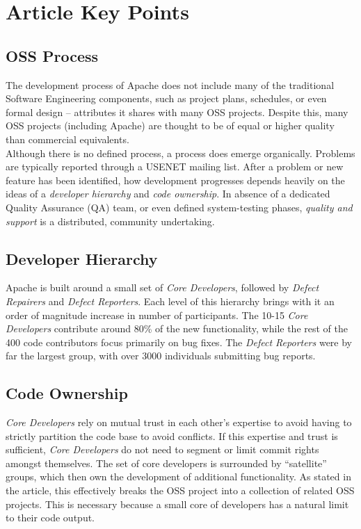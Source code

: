 \documentclass{article}
\begin{document}
\section{Article Key Points}

\subsection{OSS Process} The development process of Apache does not include many of the traditional Software Engineering components, such as project plans, schedules, or even formal design -- attributes it shares with many OSS projects\cite{dibona1999open}. Despite this, many OSS projects (including Apache) are thought to be of equal or higher quality than commercial equivalents.\\
Although there is no defined process, a process does emerge organically. Problems are typically reported through a USENET mailing list. After a problem or new feature has been identified, how development progresses depends heavily on the ideas of a {\it developer hierarchy} and {\it code ownership}. In absence of a dedicated Quality Assurance (QA) team, or even defined system-testing phases, {\it quality and support} is a distributed, community undertaking.

\subsection{Developer Hierarchy} Apache is built around a small set of {\it Core Developers}, followed by {\it Defect Repairers} and {\it Defect Reporters}. Each level of this hierarchy brings with it an order of magnitude increase in number of participants. The 10-15 {\it Core Developers} contribute around 80\% of the new functionality, while the rest of the 400 code contributors focus primarily on bug fixes. The {\it Defect Reporters} were by far the largest group, with over 3000 individuals submitting bug reports.
   
\subsection{Code Ownership} {\it Core Developers} rely on mutual trust in each other's expertise to avoid having to strictly partition the code base to avoid conflicts. If this expertise and trust is sufficient, {\it Core Developers} do not need to segment or limit commit rights amongst themselves. The set of core developers is surrounded by ``satellite'' groups, which then own the development of additional functionality. As stated in the article, this effectively breaks the OSS project into a collection of related OSS projects. This is necessary because a small core of developers has a natural limit to their code output.
\end{document}
